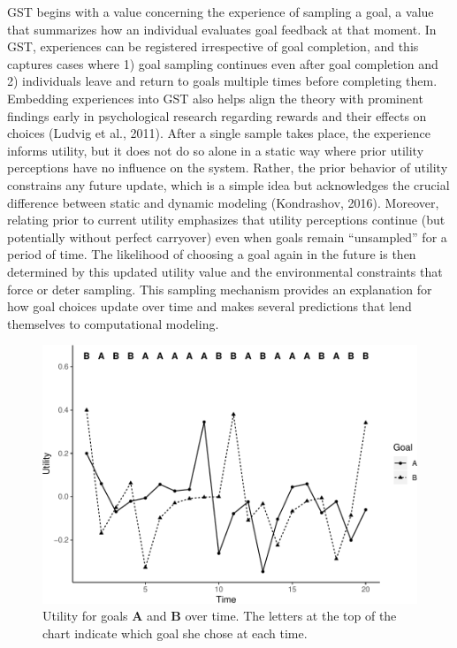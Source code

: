 \documentclass[english,,man]{apa6}
\theoremstyle{definition}
\theoremstyle{definition}
\theoremstyle{definition}
\theoremstyle{remark}
\begin{document}
GST begins with a value concerning the experience of sampling a goal, a
value that summarizes how an individual evaluates goal feedback at that
moment. In GST, experiences can be registered irrespective of goal
completion, and this captures cases where 1) goal sampling continues
even after goal completion and 2) individuals leave and return to goals
multiple times before completing them. Embedding experiences into GST
also helps align the theory with prominent findings early in
psychological research regarding rewards and their effects on choices
(Ludvig et al., 2011). After a single sample takes place, the experience
informs utility, but it does not do so alone in a static way where prior
utility perceptions have no influence on the system. Rather, the prior
behavior of utility constrains any future update, which is a simple idea
but acknowledges the crucial difference between static and dynamic
modeling (Kondrashov, 2016). Moreover, relating prior to current utility
emphasizes that utility perceptions continue (but potentially without
perfect carryover) even when goals remain ``unsampled'' for a period of
time. The likelihood of choosing a goal again in the future is then
determined by this updated utility value and the environmental
constraints that force or deter sampling. This sampling mechanism
provides an explanation for how goal choices update over time and makes
several predictions that lend themselves to computational modeling.

\begin{figure}
\centering
\includegraphics{figures/Figure1-1.pdf}
\caption{\label{fig:Figure1}Utility for goals \textbf{A} and \textbf{B} over
time. The letters at the top of the chart indicate which goal she chose
at each time.}
\end{figure}
\end{document}
